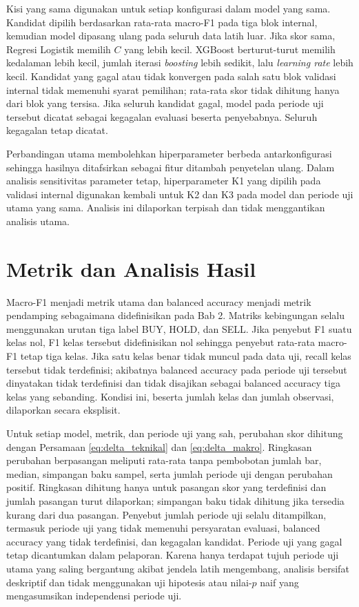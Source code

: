Kisi yang sama digunakan untuk setiap konfigurasi dalam model yang sama. Kandidat dipilih berdasarkan rata-rata macro-F1 pada tiga blok internal, kemudian model dipasang ulang pada seluruh data latih luar. Jika skor sama, Regresi Logistik memilih $C$ yang lebih kecil. XGBoost berturut-turut memilih kedalaman lebih kecil, jumlah iterasi \emph{boosting} lebih sedikit, lalu \emph{learning rate} lebih kecil. Kandidat yang gagal atau tidak konvergen pada salah satu blok validasi internal tidak memenuhi syarat pemilihan; rata-rata skor tidak dihitung hanya dari blok yang tersisa. Jika seluruh kandidat gagal, model pada periode uji tersebut dicatat sebagai kegagalan evaluasi beserta penyebabnya. Seluruh kegagalan tetap dicatat.

Perbandingan utama membolehkan hiperparameter berbeda antarkonfigurasi sehingga hasilnya ditafsirkan sebagai fitur ditambah penyetelan ulang. Dalam analisis sensitivitas parameter tetap, hiperparameter K1 yang dipilih pada validasi internal digunakan kembali untuk K2 dan K3 pada model dan periode uji utama yang sama. Analisis ini dilaporkan terpisah dan tidak menggantikan analisis utama.

\section{Metrik dan Analisis Hasil}

Macro-F1 menjadi metrik utama dan balanced accuracy menjadi metrik pendamping sebagaimana didefinisikan pada Bab 2. Matriks kebingungan selalu menggunakan urutan tiga label BUY, HOLD, dan SELL. Jika penyebut F1 suatu kelas nol, F1 kelas tersebut didefinisikan nol sehingga penyebut rata-rata macro-F1 tetap tiga kelas. Jika satu kelas benar tidak muncul pada data uji, recall kelas tersebut tidak terdefinisi; akibatnya balanced accuracy pada periode uji tersebut dinyatakan tidak terdefinisi dan tidak disajikan sebagai balanced accuracy tiga kelas yang sebanding. Kondisi ini, beserta jumlah kelas dan jumlah observasi, dilaporkan secara eksplisit.

Untuk setiap model, metrik, dan periode uji yang sah, perubahan skor dihitung dengan Persamaan \ref{eq:delta_teknikal} dan \ref{eq:delta_makro}. Ringkasan perubahan berpasangan meliputi rata-rata tanpa pembobotan jumlah bar, median, simpangan baku sampel, serta jumlah periode uji dengan perubahan positif. Ringkasan dihitung hanya untuk pasangan skor yang terdefinisi dan jumlah pasangan turut dilaporkan; simpangan baku tidak dihitung jika tersedia kurang dari dua pasangan. Penyebut jumlah periode uji selalu ditampilkan, termasuk periode uji yang tidak memenuhi persyaratan evaluasi, balanced accuracy yang tidak terdefinisi, dan kegagalan kandidat. Periode uji yang gagal tetap dicantumkan dalam pelaporan. Karena hanya terdapat tujuh periode uji utama yang saling bergantung akibat jendela latih mengembang, analisis bersifat deskriptif dan tidak menggunakan uji hipotesis atau nilai-$p$ naif yang mengasumsikan independensi periode uji.


